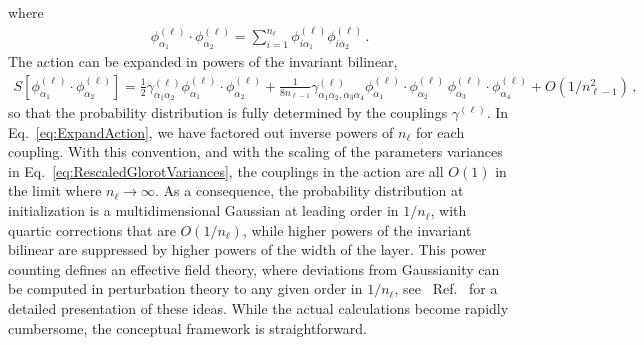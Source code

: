 \documentclass[11pt]{article}
\begin{document}
where
\begin{align}
    \label{eq:PhiInvariant}
    \phi^{(\ell)}_{\alpha_1} 
            \cdot \phi^{(\ell)}_{\alpha_2} = 
    \sum_{i=1}^{n_\ell} \phi^{(\ell)}_{i \alpha_1} \phi^{(\ell)}_{i \alpha_2}\, .
\end{align}
The action can be expanded in powers of the invariant bilinear, 
\begin{align}
    \label{eq:ExpandAction}
    S\left[\phi^{(\ell)}_{\alpha_1} 
            \cdot \phi^{(\ell)}_{\alpha_2}\right] = 
        \frac12 \gamma^{(\ell)}_{\alpha_1\alpha_2} 
            \phi^{(\ell)}_{\alpha_1} \cdot \phi^{(\ell)}_{\alpha_2} + 
            \frac{1}{8 n_{\ell-1}} \gamma^{(\ell)}_{\alpha_1\alpha_2,\alpha_3\alpha_4}
            \phi^{(\ell)}_{\alpha_1} \cdot \phi^{(\ell)}_{\alpha_2} \,
            \phi^{(\ell)}_{\alpha_3} \cdot \phi^{(\ell)}_{\alpha_4} + O(1/n_{\ell-1}^2)\, ,
\end{align}
so that the probability distribution is fully determined by the couplings $\gamma^{(\ell)}$. In 
Eq.~\eqref{eq:ExpandAction}, we have factored out inverse powers of $n_\ell$ for each coupling. 
With this convention, and with the scaling of the parameters variances in 
Eq.~\eqref{eq:RescaledGlorotVariances}, the couplings in the action are all $O(1)$ 
in the limit where $n_\ell\to\infty$.
As a consequence, the probability distribution at initialization is a multidimensional Gaussian at 
leading order in $1/n_\ell$, with quartic corrections that are $O(1/n_\ell)$, while higher powers 
of the invariant bilinear are suppressed by higher powers of the width of the layer. This power counting
defines an effective field theory, where deviations from Gaussianity can be computed in perturbation
theory to any given order in $1/n_\ell$, see \eg\ Ref.~\cite{Roberts:2021fes} for a detailed 
presentation of these ideas. While the actual calculations become rapidly cumbersome, the 
conceptual framework is straightforward. 
\end{document}
